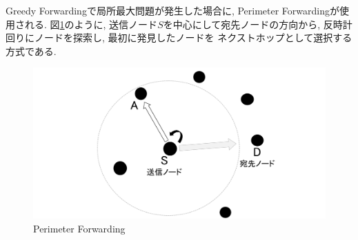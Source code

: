 Greedy Forwardingで局所最大問題が発生した場合に, 
Perimeter Forwardingが使用される. 
図\ref{fig:perimeter}のように, 送信ノード$S$を中心にして宛先ノードの方向から,  
反時計回りにノードを探索し, 最初に発見したノードを
ネクストホップとして選択する方式である.

\begin{figure}
  \centering
  \includegraphics[scale=0.75]{figures/perimeter.png}
  \caption{Perimeter Forwarding}
  \label{fig:perimeter}
\end{figure}